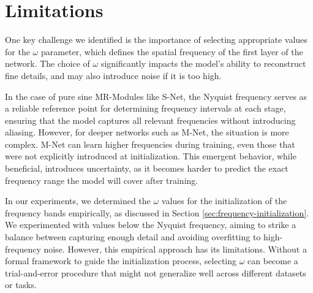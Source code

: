 

\section{Limitations}

One key challenge we identified is the importance of selecting appropriate values for the $\omega$ parameter, which defines the spatial frequency of the first layer of the network. The choice of $\omega$ significantly impacts the model's ability to reconstruct fine details, and may also introduce noise if it is too high.

In the case of pure sine MR-Modules like S-Net, the Nyquist frequency serves as a reliable reference point for determining frequency intervals at each stage, ensuring that the model captures all relevant frequencies without introducing aliasing. However, for deeper networks such as M-Net, the situation is more complex. M-Net can learn higher frequencies during training, even those that were not explicitly introduced at initialization. This emergent behavior, while beneficial, introduces uncertainty, as it becomes harder to predict the exact frequency range the model will cover after training.


In our experiments, we determined the $\omega$ values for the initialization of the frequency bands empirically, as discussed in Section \ref{sec:frequency-initialization}. We experimented with values below the Nyquist frequency, aiming to strike a balance between capturing enough detail and avoiding overfitting to high-frequency noise. However, this empirical approach has its limitations. Without a formal framework to guide the initialization process, selecting $\omega$ can become a trial-and-error procedure that might not generalize well across different datasets or tasks.

